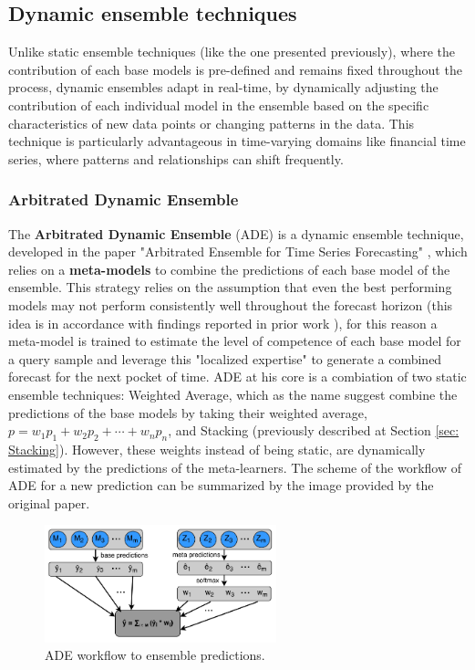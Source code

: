 \subsection{Dynamic ensemble techniques}
Unlike static ensemble techniques (like the one presented previously), where the contribution of each base models is pre-defined and remains fixed throughout the process, dynamic ensembles adapt in real-time, by dynamically adjusting the contribution of each individual model in the ensemble based on the specific characteristics of new data points or changing patterns in the data. This technique is particularly advantageous in time-varying domains like financial time series, where patterns and relationships can shift frequently. 

\subsubsection{Arbitrated Dynamic Ensemble}
\label{Arbitrated Dynamic Ensemble}
The \textbf{Arbitrated Dynamic Ensemble} (ADE) is a dynamic ensemble technique, developed in the paper "Arbitrated Ensemble for Time Series Forecasting" \cite{cerqueira2017arbitrated}, which relies on a \textbf{meta-models} to combine the predictions of each base model of the ensemble. This strategy relies on the assumption that even the best performing models may not perform consistently well throughout the forecast horizon (this idea is in accordance with findings reported in prior
work \cite{aiolfi2006persistence}), for this reason a meta-model is trained to estimate the level of competence of each base model for a query sample and leverage this "localized expertise" to generate a combined forecast for the next pocket of time. ADE at his core is a combiation of two static ensemble techniques: Weighted Average, which as the name suggest combine the predictions of the base models by taking their weighted average, $p = w_1 p_1 + w_2 p_2 + \cdots + w_n p_n$,  and Stacking (previously described at Section \ref{sec: Stacking}). However, these weights instead of being static, are dynamically estimated by the predictions of the meta-learners. The scheme of the workflow of ADE for a new prediction can be summarized by the image provided by the original paper.
\begin{figure}[H] 
    \centering
    \includegraphics[width=0.6\textwidth]{Machine_learning_thesis/Images/ADE schema.png}
    \caption{ADE workflow to ensemble predictions.} 
    \label{fig:ADE} 
\end{figure}
